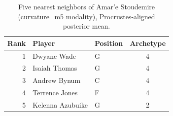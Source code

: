 \begin{table}[htbp]
  \centering\small
  \begin{tabular}{rllc}
    \toprule
    Rank & Player & Position & Archetype \\
    \midrule
    1 & Dwyane Wade & G & 4 \\
    2 & Isaiah Thomas & G & 4 \\
    3 & Andrew Bynum & C & 4 \\
    4 & Terrence Jones & F & 4 \\
    5 & Kelenna Azubuike & G & 2 \\
    \bottomrule
  \end{tabular}
  \caption{Five nearest neighbors of Amar'e Stoudemire (curvature_m5 modality), Procrustes-aligned posterior mean.}
  \label{tab:Amar_e_Stoudemire_neighbors_curvature_m5}
\end{table}


